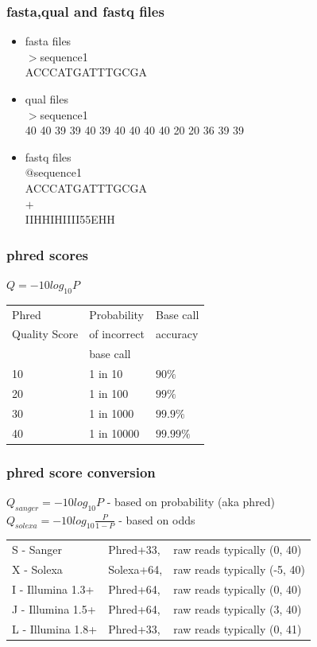 \documentclass[pdf]{beamer}
\begin{document}
\begin{frame}
  \frametitle{fasta,qual and fastq files}
  \begin{itemize}
  \item fasta files\\%
  $>$sequence1\\
  ACCCATGATTTGCGA
  \item qual files\\%
  $>$sequence1\\
  40 40 39 39 40 39 40 40 40 40 20 20 36 39 39
  \item fastq files\\%
  $@$sequence1\\
  ACCCATGATTTGCGA\\
  $+$\\
  IIHHIHIIII55EHH
  \end{itemize}
\end{frame}

\begin{frame}
  \frametitle{phred scores}
$Q = -10log_{10}P$
\begin{center}
\begin{tabular}{|l|l|l|}
\hline
Phred & Probability &	Base call \\
Quality Score	& of incorrect  & accuracy \\
 & base call & \\
\hline
10	&	1 in 10	&	$90\%$\\
20	&	1 in 100 &	$99\%$\\
30	&	1 in 1000	&	$99.9\%$\\
40	&	1 in 10000	&	$99.99\%$\\
\hline
\end{tabular}
\end{center}
\end{frame}
\begin{frame}
  \frametitle{phred score conversion}
$Q_{sanger} = -10log_{10}P$ - based on probability (aka phred)
\\

$Q_{solexa} = -10log_{10}\frac{P}{1-P}$ - based on odds
\begin{center}
\begin{tabular}{ l l l }
S - Sanger        &Phred+33,  &raw reads typically (0, 40) \\
X - Solexa        &Solexa+64, &raw reads typically (-5, 40) \\
I - Illumina 1.3+ &Phred+64,  &raw reads typically (0, 40) \\
J - Illumina 1.5+ &Phred+64,  &raw reads typically (3, 40) \\
L - Illumina 1.8+ &Phred+33,  &raw reads typically (0, 41) \\
\end{tabular}
\end{center}
\end{frame} 
\end{document}
